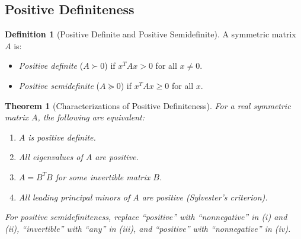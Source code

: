 \documentclass[11pt,a4paper]{article}
\theoremstyle{definition}
\newtheorem{definition}{Definition}[section]
\theoremstyle{plain}
\newtheorem{theorem}{Theorem}[section]
\theoremstyle{remark}
\begin{document}
\subsection{Positive Definiteness}
\label{subsec:positive_definite}

\begin{definition}[Positive Definite and Positive Semidefinite]
\label{def:positive_definite}
A symmetric matrix $A$ is:
\begin{itemize}[nosep]
    \item \emph{Positive definite} ($A \succ 0$) if $x^T A x > 0$ for all $x \neq 0$.
    \item \emph{Positive semidefinite} ($A \succeq 0$) if $x^T A x \geq 0$ for all $x$.
\end{itemize}
\end{definition}

\begin{theorem}[Characterizations of Positive Definiteness]
\label{thm:pd_characterizations}
For a real symmetric matrix $A$, the following are equivalent:
\begin{enumerate}[nosep,label=(\roman*)]
    \item $A$ is positive definite.
    \item All eigenvalues of $A$ are positive.
    \item $A = B^T B$ for some invertible matrix $B$.
    \item All leading principal minors of $A$ are positive (Sylvester's criterion).
\end{enumerate}
For positive semidefiniteness, replace ``positive'' with ``nonnegative'' in (i) and (ii),
``invertible'' with ``any'' in (iii), and ``positive'' with ``nonnegative'' in (iv).
\end{theorem}
\end{document}
